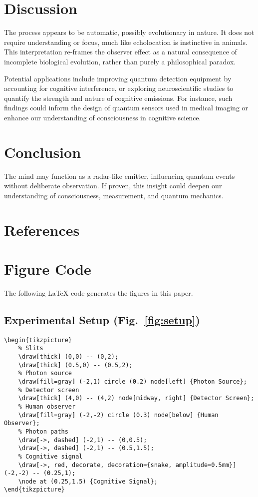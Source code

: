 \documentclass[12pt]{IEEEtran}
\begin{document}
\section{Discussion}
The process appears to be automatic, possibly evolutionary in nature. It does not require understanding or focus, much like echolocation is instinctive in animals. This interpretation re-frames the observer effect as a natural consequence of incomplete biological evolution, rather than purely a philosophical paradox.

Potential applications include improving quantum detection equipment by accounting for cognitive interference, or exploring neuroscientific studies to quantify the strength and nature of cognitive emissions. For instance, such findings could inform the design of quantum sensors used in medical imaging or enhance our understanding of consciousness in cognitive science.

\section{Conclusion}
The mind may function as a radar-like emitter, influencing quantum events without deliberate observation. If proven, this insight could deepen our understanding of consciousness, measurement, and quantum mechanics.

\section*{References}



\appendices
\section{Figure Code}
\label{app:figures}
The following LaTeX code generates the figures in this paper.

\subsection{Experimental Setup (Fig.~\ref{fig:setup})}
\begin{verbatim}
\begin{tikzpicture}
    % Slits
    \draw[thick] (0,0) -- (0,2);
    \draw[thick] (0.5,0) -- (0.5,2);
    % Photon source
    \draw[fill=gray] (-2,1) circle (0.2) node[left] {Photon Source};
    % Detector screen
    \draw[thick] (4,0) -- (4,2) node[midway, right] {Detector Screen};
    % Human observer
    \draw[fill=gray] (-2,-2) circle (0.3) node[below] {Human Observer};
    % Photon paths
    \draw[->, dashed] (-2,1) -- (0,0.5);
    \draw[->, dashed] (-2,1) -- (0.5,1.5);
    % Cognitive signal
    \draw[->, red, decorate, decoration={snake, amplitude=0.5mm}] (-2,-2) -- (0.25,1);
    \node at (0.25,1.5) {Cognitive Signal};
\end{tikzpicture}
\end{verbatim}
\end{document}

